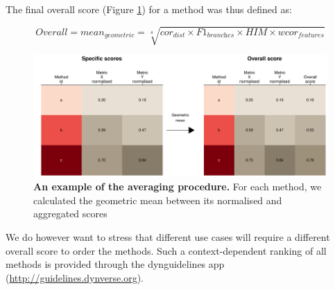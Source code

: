 The final overall score (Figure \ref{fig:snote1fig_14}) for a method was thus defined as: 

$$\textit{Overall} = \textit{mean}_{\textit{geometric}} = \sqrt[4]{\textit{cor}_{\textit{dist}} \times \textit{F1}_{\textit{branches}} \times \textit{HIM} \times \textit{wcor}_{\textit{features}}}$$

\begin{figure}[htb!]
	\centering\includegraphics[width=0.8\linewidth]{fig/snote1fig_14.pdf}
	\caption{
		\textbf{An example of the averaging procedure.} 
		For each method, we calculated the geometric mean between its normalised and aggregated scores
	}
	\label{fig:snote1fig_14}
\end{figure}

We do however want to stress that different use cases will require a different overall score to order the methods. Such a context-dependent ranking of all methods is provided through the dynguidelines app (\href{http://guidelines.dynverse.org}{http://guidelines.dynverse.org}).
